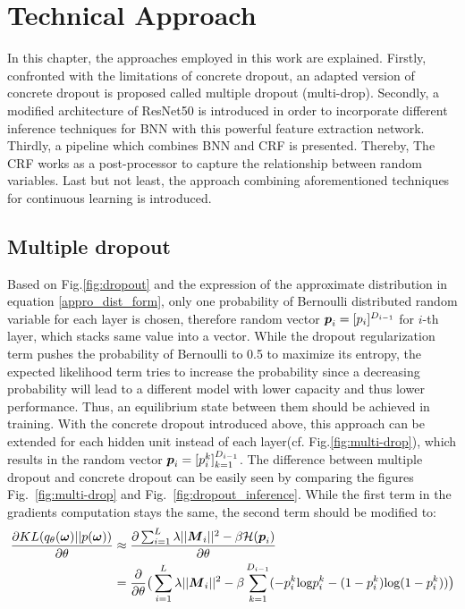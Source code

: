 \chapter{Technical Approach}
In this chapter, the approaches employed in this work are explained.
Firstly, confronted with the limitations of concrete dropout, an adapted version of concrete dropout is proposed called multiple dropout (multi-drop).
Secondly, a modified architecture of ResNet50 is introduced in order to incorporate different inference techniques for BNN with this powerful feature extraction network.
Thirdly, a pipeline which combines BNN and CRF is presented.
Thereby, The CRF works as a post-processor to capture the relationship between random variables.
Last but not least, the approach combining aforementioned techniques for continuous learning is introduced.


\section{Multiple dropout}
Based on Fig.\ref{fig:dropout} and the expression of the approximate distribution in equation \ref{appro_dist_form}, only one probability of Bernoulli distributed random variable for each layer is chosen, therefore random vector $\boldsymbol p_i = [p_i]^{D_{i-1}}$ for $i$-th layer, which stacks same value into a vector. %
While the dropout regularization term pushes the probability of Bernoulli to 0.5 to maximize its entropy, the expected likelihood term tries to increase the probability since a decreasing probability will lead to a different model with lower capacity and thus lower performance.
Thus, an equilibrium state between them should be achieved in training.
With the concrete dropout introduced above, this approach can be extended for each hidden unit instead of each layer(cf. Fig.\ref{fig:multi-drop}), which results in the random vector $\boldsymbol p_i = [p_i^k]_{k=1}^{D_{i-1}}$.
The difference between multiple dropout and concrete dropout can be easily seen by comparing the figures Fig.~\ref{fig:multi-drop} and Fig.~\ref{fig:dropout_inference}.
While the first term in the gradients computation stays the same, the second term should be modified to:
\begin{equation} 
\begin{aligned}\label{KL_grad_multi}
\frac{\partial KL(q_{\theta}(\boldsymbol \omega)||p(\boldsymbol \omega))}{\partial \theta} 
&\approx \frac{\partial \sum_{i=1}^{L}\lambda||\boldsymbol M_{i}||^{2}- \beta \mathcal H(\boldsymbol p_{i})}{\partial \theta}  \\
&= \frac{\partial}{\partial \theta} \big( \sum_{i=1}^{L}\lambda||\boldsymbol M_{i}||^{2}- \beta \sum_{k=1}^{D_{i-1}}(-p_i^k\text{log}p_i^k - (1-p_i^k)\text{log}(1-p_i^k))\big)
\end{aligned}
\end{equation}  

